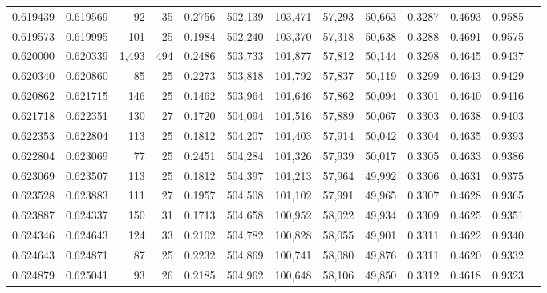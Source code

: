 \begin{tabular}{rrrrrrrrrrrrr}
0.619439 & 0.619569 &    92 &  35 &                                     0.2756 & 502,139 & 103,471 &  57,293 &  50,663 & 0.3287 & 0.4693 & 0.9585 \\
0.619573 & 0.619995 &   101 &  25 &                                     0.1984 & 502,240 & 103,370 &  57,318 &  50,638 & 0.3288 & 0.4691 & 0.9575 \\
0.620000 & 0.620339 & 1,493 & 494 &                                     0.2486 & 503,733 & 101,877 &  57,812 &  50,144 & 0.3298 & 0.4645 & 0.9437 \\
0.620340 & 0.620860 &    85 &  25 &                                     0.2273 & 503,818 & 101,792 &  57,837 &  50,119 & 0.3299 & 0.4643 & 0.9429 \\
0.620862 & 0.621715 &   146 &  25 &                                     0.1462 & 503,964 & 101,646 &  57,862 &  50,094 & 0.3301 & 0.4640 & 0.9416 \\
0.621718 & 0.622351 &   130 &  27 &                                     0.1720 & 504,094 & 101,516 &  57,889 &  50,067 & 0.3303 & 0.4638 & 0.9403 \\
0.622353 & 0.622804 &   113 &  25 &                                     0.1812 & 504,207 & 101,403 &  57,914 &  50,042 & 0.3304 & 0.4635 & 0.9393 \\
0.622804 & 0.623069 &    77 &  25 &                                     0.2451 & 504,284 & 101,326 &  57,939 &  50,017 & 0.3305 & 0.4633 & 0.9386 \\
0.623069 & 0.623507 &   113 &  25 &                                     0.1812 & 504,397 & 101,213 &  57,964 &  49,992 & 0.3306 & 0.4631 & 0.9375 \\
0.623528 & 0.623883 &   111 &  27 &                                     0.1957 & 504,508 & 101,102 &  57,991 &  49,965 & 0.3307 & 0.4628 & 0.9365 \\
0.623887 & 0.624337 &   150 &  31 &                                     0.1713 & 504,658 & 100,952 &  58,022 &  49,934 & 0.3309 & 0.4625 & 0.9351 \\
0.624346 & 0.624643 &   124 &  33 &                                     0.2102 & 504,782 & 100,828 &  58,055 &  49,901 & 0.3311 & 0.4622 & 0.9340 \\
0.624643 & 0.624871 &    87 &  25 &                                     0.2232 & 504,869 & 100,741 &  58,080 &  49,876 & 0.3311 & 0.4620 & 0.9332 \\
0.624879 & 0.625041 &    93 &  26 &                                     0.2185 & 504,962 & 100,648 &  58,106 &  49,850 & 0.3312 & 0.4618 & 0.9323 \\

\end{tabular}
